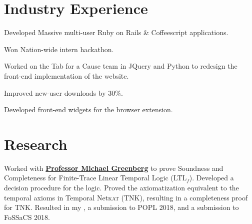 \documentclass[]{deedy-resume-openfont}
\begin{document}
\begin{minipage}[t]{0.33\textwidth}
%
%

\end{minipage} 
\hfill
\begin{minipage}[t]{0.66\textwidth} 


\section{Industry Experience}

\vspace{\topsep} %
\begin{tightemize}
  \item Developed Massive multi-user Ruby on Rails \& Coffeescript applications.
  \item Won Nation-wide intern hackathon.
\end{tightemize}
\sectionsep

\begin{tightemize}
\item Worked on the Tab for a Cause team in JQuery and Python to redesign the front-end implementation of the website.
\item Improved new-user downloads by 30\%.
\item Developed front-end widgets for the browser extension.\end{tightemize}
\sectionsep


\section{Research}
Worked with \textbf{\href{http://www.cs.pomona.edu/~michael/}{Professor Michael Greenberg}} to prove Soundness and Completeness for Finite-Trace Linear Temporal Logic (LTL$_f$). Developed a decision procedure for the logic. Proved the axiomatization equivalent to the temporal axioms in Temporal Net\textsc{kat} (TNK), resulting in a completeness proof for TNK. Resulted in my \href{https://ericthewry.github.io/pdfs/thesis.pdf}{}, a submission to POPL 2018, and a submission to FoSSaCS 2018.
\sectionsep


\end{minipage}
\end{document}
